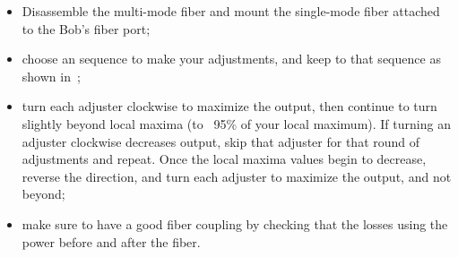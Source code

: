 \begin{itemize}
  \item Disassemble the multi-mode fiber and mount the single-mode fiber attached to the Bob's fiber port;
  \item choose an sequence to make your adjustments, and keep to that sequence as shown in~;
  \item turn each adjuster clockwise to maximize the output, then continue to turn slightly beyond local maxima (to ~95\% of your local maximum). If turning an adjuster clockwise decreases output, skip that adjuster for that round of adjustments and repeat. Once the local maxima values begin to decrease, reverse the direction, and turn each adjuster to maximize the output, and not beyond;
  \item make sure to have a good fiber coupling by checking that the losses using the power before and after the fiber.
\end{itemize}



